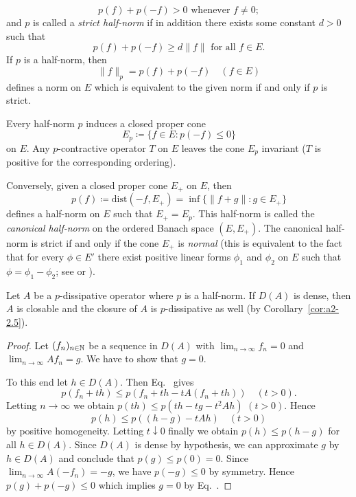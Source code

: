 \begin{equation}\label{eq:a2-2.11}
p(f) + p(-f) > 0 \text{ whenever } f \neq 0;
\end{equation}
and $p$ is called a \emph{strict half-norm} if in addition there exists some constant $d > 0$ such that
\begin{equation}\label{eq:a2-2.12}
p(f) + p(-f) \geq d\|f\| \text{ for all } f \in E.
\end{equation}
If\/ $p$ is a half-norm, then
\begin{equation}\label{eq:a2-2.13}
\|f\|_p = p(f) + p(-f) \quad (f \in E)
\end{equation}
defines a norm on $E$ which is equivalent to the given norm if and only if\/ $p$ is strict.

\begin{remark}\label{rem:a2-2.8}
Every half-norm $p$ induces a closed proper cone 
\[
E_{p} \coloneq \{f \in E \colon p(-f) \leq 0\}
\] 
on $E$.
Any $p$-contractive operator $T$ on $E$ leaves the cone $E_{p}$ invariant (\ie  $T$ is positive for the corresponding ordering).

Conversely, given a closed proper cone $E_{+}$ on $E$, then 
\[
p(f) \coloneq \text{dist}(-f,E_{+}) = \inf\{\|f + g\| \colon g \in E_{+}\}
\]
defines a half-norm on $E$ such that $E_{+} = E_{p}$.
This half-norm is called the \emph{canonical half-norm} on the ordered Banach space $(E,E_{+})$.
The canonical half-norm is strict if and only if the cone $E_{+}$ is \emph{normal} (this is equivalent to the fact that for every $\phi \in E'$ there exist positive linear forms $\phi_{1}$ and $\phi_{2}$ on $E$ such that $\phi = \phi_{1} - \phi_{2}$; see \textcite{battyrobinson:1984} or \textcite[Chapter V]{schaefer:1966}).
\end{remark}
\begin{proposition}\label{prop:a2-2.9}
Let $A$ be a $p$-dissipative operator where $p$ is a half-norm.
If\/ $D(A)$ is dense, then $A$ is closable and the closure of\/ $A$ is $p$-dissipative as well (by Corollary~\ref{cor:a2-2.5}). 
\end{proposition}
\begin{proof}
Let $(f_{n})_{n \in \mathbb{N}}$ be a sequence in $D(A)$ with $\lim_{n \to \infty} f_{n} = 0$ and $\lim_{n \to \infty} Af_{n} = g$.
We have to show that $g = 0$.

To this end let $h \in D(A)$.
Then Eq.~   
gives 
%	
\[
p(f_{n} + th) \leq p(f_{n} + th - tA(f_{n} + th)) \quad (t > 0) .
\]
%
Letting $n \to \infty$ we obtain 
$p(th) \leq p(th - tg - t^{2}Ah)$ \quad $(t > 0)$.
Hence 
\[
p(h) \leq p((h-g) - tAh) \quad (t > 0)
\] 
by positive homogeneity.
Letting $t \downarrow 0$ finally we obtain $p(h) \leq p(h - g)$ for all $h \in D(A)$.
Since $D(A)$ is dense by hypothesis, we can approximate $g$ by $h \in D(A)$ and conclude that $p(g) \leq p(0) = 0$.
Since $\lim_{n\to\infty} A(-f_{n}) = -g$, we have $p(-g) \leq 0$ by symmetry.
Hence $p(g) + p(-g) \leq 0$ which implies $g = 0$ by Eq.~. 
\end{proof}
